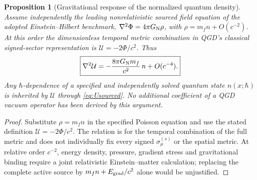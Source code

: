 \documentclass[11pt,a4paper,oneside]{report}
\numberwithin{equation}{chapter}
\newtheorem{proposition}[theorem]{Proposition}
\theoremstyle{definition}\newtheorem{definition}[theorem]{Definition}
\theoremstyle{remark}\newtheorem{remark}[theorem]{Remark}
\begin{document}
\begin{proposition}[Gravitational response of the normalized quantum density]\label{prop:quantumsource}
Assume independently the leading nonrelativistic sourced field equation of the adopted Einstein--Hilbert benchmark, $\nabla^2\Phi=4\pi G_{\rm N}\rho$, with $\rho=m_fn+O(c^{-2})$. At this order the dimensionless temporal metric combination in QGD's classical signed-sector representation is $\mathcal U=-2\Phi/c^2$. Thus
\begin{equation}
\boxed{\displaystyle
\nabla^2\mathcal U=-\frac{8\pi G_{\rm N}m_f}{c^2}\,n+O(c^{-4}) .}
\label{eq:Usourced}
\end{equation}
Any $\hbar$-dependence of a \emph{specified and independently solved} quantum state $n(x;\hbar)$ is inherited by $\mathcal U$ through \eqref{eq:Usourced}. No additional coefficient of a QGD vacuum operator has been derived by this argument.
\end{proposition}
\begin{proof}
Substitute $\rho=m_fn$ in the specified Poisson equation and use the stated definition $\mathcal U=-2\Phi/c^2$. The relation is for the temporal combination of the full metric and does not individually fix every signed $\sigma_\mu^{(s)}$ or the spatial metric. At relative order $c^{-2}$, energy density, pressure, gradient stress and gravitational binding require a joint relativistic Einstein--matter calculation; replacing the complete active source by $m_fn+E_{\rm grad}/c^2$ alone would be unjustified.
\end{proof}
\end{document}
